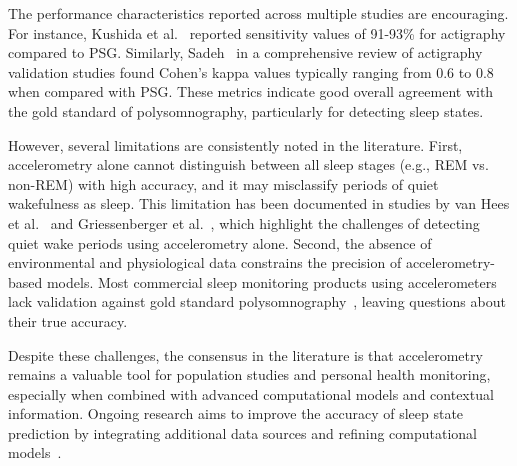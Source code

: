 \documentclass[conference]{IEEEtran}
\begin{document}
The performance characteristics reported across multiple studies are encouraging. For instance, Kushida et al.~\cite{kushida2001} reported sensitivity values of 91-93\% for actigraphy compared to PSG. Similarly, Sadeh~\cite{sadeh2011} in a comprehensive review of actigraphy validation studies found Cohen's kappa values typically ranging from 0.6 to 0.8 when compared with PSG. These metrics indicate good overall agreement with the gold standard of polysomnography, particularly for detecting sleep states.

However, several limitations are consistently noted in the literature. First, accelerometry alone cannot distinguish between all sleep stages (e.g., REM vs. non-REM) with high accuracy, and it may misclassify periods of quiet wakefulness as sleep. This limitation has been documented in studies by van Hees et al.~\cite{vanHees2015} and Griessenberger et al.~\cite{griessenberger2013}, which highlight the challenges of detecting quiet wake periods using accelerometry alone. Second, the absence of environmental and physiological data constrains the precision of accelerometry-based models. Most commercial sleep monitoring products using accelerometers lack validation against gold standard polysomnography~\cite{researchgate2021, behar2013}, leaving questions about their true accuracy.

Despite these challenges, the consensus in the literature is that accelerometry remains a valuable tool for population studies and personal health monitoring, especially when combined with advanced computational models and contextual information. Ongoing research aims to improve the accuracy of sleep state prediction by integrating additional data sources and refining computational models~\cite{zhang2020machine, vanHees2015, behar2013}.



\end{document}
